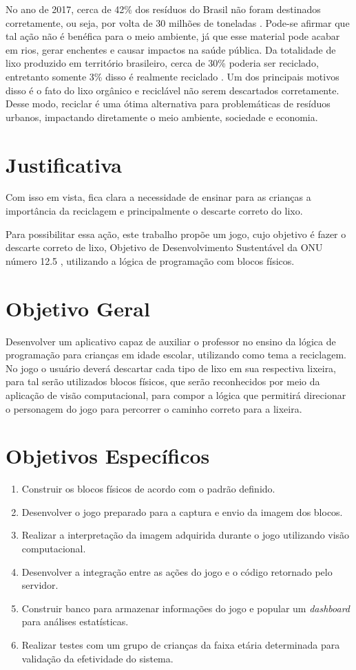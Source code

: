 No ano de 2017, cerca de 42\% dos resíduos do Brasil não foram destinados corretamente, ou seja, por volta de 30 milhões de toneladas \cite{abrelpe_2017}. Pode-se afirmar que tal ação não é benéfica para o meio ambiente, já que esse material pode acabar em rios, gerar enchentes e causar impactos na saúde pública. Da totalidade de lixo produzido em território brasileiro, cerca de 30\% poderia ser reciclado, entretanto somente 3\% disso é realmente reciclado \cite{}. Um dos principais motivos disso é o fato do lixo orgânico e reciclável não serem descartados corretamente. Desse modo, reciclar é uma ótima alternativa para problemáticas de resíduos urbanos, impactando diretamente o meio ambiente, sociedade e economia. 

\section{Justificativa}

Com isso em vista, fica clara a necessidade de ensinar para as crianças a importância da reciclagem e principalmente o descarte correto do lixo.

Para possibilitar essa ação, este trabalho propõe um jogo, cujo objetivo é fazer o descarte correto de lixo, Objetivo de Desenvolvimento Sustentável da ONU número 12.5 \cite{onu_2015}, utilizando a lógica de programação com blocos físicos.

\section{Objetivo Geral}

Desenvolver um aplicativo capaz de auxiliar o professor no ensino da lógica de programação para crianças em idade escolar, utilizando como tema a reciclagem. No jogo o usuário deverá descartar cada tipo de lixo em sua respectiva lixeira, para tal serão utilizados blocos físicos, que serão reconhecidos por meio da aplicação de visão computacional, para compor a lógica que permitirá direcionar o personagem do jogo para percorrer o caminho correto para a lixeira.

\section{Objetivos Específicos}

\begin{enumerate}
\item Construir os blocos físicos de acordo com o padrão definido.
\item Desenvolver o jogo preparado para a captura e envio da imagem dos blocos.
\item Realizar a interpretação da imagem adquirida durante o jogo utilizando visão computacional.
\item Desenvolver a integração entre as ações do jogo e o código retornado pelo servidor.
\item Construir banco para armazenar informações do jogo e popular um \textit{dashboard} para análises estatísticas.
\item Realizar testes com um grupo de crianças da faixa etária determinada para validação da efetividade do sistema.
\end{enumerate}
